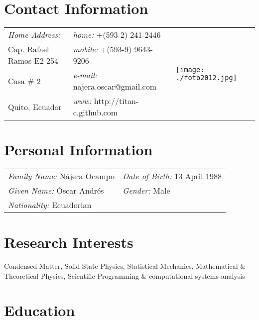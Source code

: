 \documentclass[margin,line]{res}
\newenvironment{list1}{
  \begin{list}{\ding{113}}{%
      \setlength{\itemsep}{0in}
      \setlength{\parsep}{0in} \setlength{\parskip}{0in}
      \setlength{\topsep}{0in} \setlength{\partopsep}{0in} 
      \setlength{\leftmargin}{0.17in}}}{\end{list}}
\begin{document}

\begin{resume}

\section{\sc Contact Information}
  \begin{tabular}{@{}p{2in}p{2.5in}p{3cm} }
    {\it Home Address:}    & {\it home:}  +(593-2) 241-2446 &
      \multirow{4}{*}{ \texttt{[image: ./foto2012.jpg]}}\\

    Cap. Rafael Ramos E2-254  & {\it mobile:} +(593-9) 9643-9206 \\
    Casa \# 2      & {\it e-mail:}  najera.oscar@gmail.com\\
    Quito, Ecuador    & {\it www:} http://titan-c.github.com
  \end{tabular}\vspace{0.5cm}

\section{\sc Personal Information}
 \begin{tabular}{ll}
  {\it Family Name:} Nájera Ocampo & {\it Date of Birth:} 13 April 1988\\
  {\it Given Name:} Óscar Andrés   & {\it Gender:} Male\\
  {\it Nationality:} Ecuadorian    & %
 \end{tabular}

\section{\sc Research Interests}
  Condensed Matter, Solid State Physics, Statistical Mechanics, Mathematical \& Theoretical Physics, Scientific Programming \& computational systems analysis

\section{\sc Education}


\end{resume}
\end{document}
